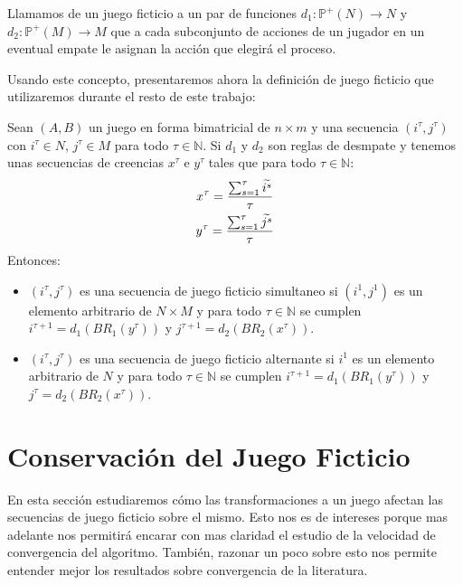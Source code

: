 \begin{definition}
    Llamamos  de un juego ficticio a un par de funciones $d_1: \mathbb{P}^+(N) \rightarrow N$ y $d_2: \mathbb{P}^+(M) \rightarrow M$ que a cada subconjunto de acciones de un jugador en un eventual empate le asignan la acción que elegirá el proceso.
\end{definition}

Usando este concepto, presentaremos ahora la definición de juego ficticio que utilizaremos durante el resto de este trabajo:

\begin{definition} \label{def:fp:berger_desempate}
    Sean $(A, B)$ un juego en forma bimatricial de $n \times m$ y una secuencia $(i^\tau, j^\tau)$ con $i^\tau \in N$, $j^\tau \in M$ para todo $\tau \in \mathbb{N}$. Si $d_1$ y $d_2$ son reglas de desmpate y tenemos unas secuencias de creencias $x^\tau$ e $y^\tau$ tales que para todo $\tau \in \mathbb{N}$:
    \begin{gather*}
        x^\tau= \frac{\sum^\tau_{s=1} \widetilde{i^s}}{\tau}  \\
        y^\tau= \frac{\sum^\tau_{s=1} \widetilde{j^s}}{\tau}
    \end{gather*}
    Entonces:
    \begin{itemize}
        \item $(i^\tau, j^\tau)$ es una secuencia de juego ficticio simultaneo si $(i^1, j^1)$ es un elemento arbitrario de $N \times M$ y para todo $\tau \in \mathbb{N}$ se cumplen $i^{\tau+1} = d_1(BR_1(y^\tau))$ y $j^{\tau+1} = d_2(BR_2(x^\tau))$.
        \item $(i^\tau, j^\tau)$ es una secuencia de juego ficticio alternante si $i^1$ es un elemento arbitrario de $N$ y para todo $\tau \in \mathbb{N}$ se cumplen $i^{\tau+1} = d_1(BR_1(y^\tau))$ y $j^{\tau} = d_2(BR_2(x^\tau))$.
    \end{itemize}
\end{definition}

\section{Conservación del Juego Ficticio}

En esta sección estudiaremos cómo las transformaciones a un juego afectan las secuencias de juego ficticio sobre el mismo. Esto nos es de intereses porque mas adelante nos permitirá encarar con mas claridad el estudio de la velocidad de convergencia del algoritmo. También, razonar un poco sobre esto nos permite entender mejor los resultados sobre convergencia de la literatura.


